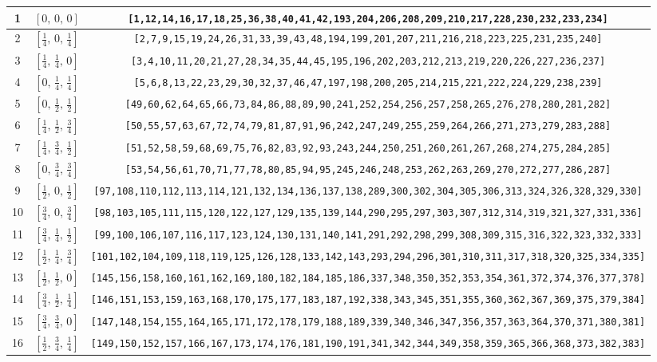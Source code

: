 \documentclass[fleqn,8pt]{jsarticle}
\begin{document}
\begin{longtable}{ccc}
1 & $\left[ 0,\, 0,\, 0 \right]$ & {\tt [1,12,14,16,17,18,25,36,38,40,41,42,193,204,206,208,209,210,217,228,230,232,233,234]} \\ \hline
2 & $\left[ \frac{1}{4},\, 0,\, \frac{1}{4} \right]$ & {\tt [2,7,9,15,19,24,26,31,33,39,43,48,194,199,201,207,211,216,218,223,225,231,235,240]} \\ \hline
3 & $\left[ \frac{1}{4},\, \frac{1}{4},\, 0 \right]$ & {\tt [3,4,10,11,20,21,27,28,34,35,44,45,195,196,202,203,212,213,219,220,226,227,236,237]} \\ \hline
4 & $\left[ 0,\, \frac{1}{4},\, \frac{1}{4} \right]$ & {\tt [5,6,8,13,22,23,29,30,32,37,46,47,197,198,200,205,214,215,221,222,224,229,238,239]} \\ \hline
5 & $\left[ 0,\, \frac{1}{2},\, \frac{1}{2} \right]$ & {\tt [49,60,62,64,65,66,73,84,86,88,89,90,241,252,254,256,257,258,265,276,278,280,281,282]} \\ \hline
6 & $\left[ \frac{1}{4},\, \frac{1}{2},\, \frac{3}{4} \right]$ & {\tt [50,55,57,63,67,72,74,79,81,87,91,96,242,247,249,255,259,264,266,271,273,279,283,288]} \\ \hline
7 & $\left[ \frac{1}{4},\, \frac{3}{4},\, \frac{1}{2} \right]$ & {\tt [51,52,58,59,68,69,75,76,82,83,92,93,243,244,250,251,260,261,267,268,274,275,284,285]} \\ \hline
8 & $\left[ 0,\, \frac{3}{4},\, \frac{3}{4} \right]$ & {\tt [53,54,56,61,70,71,77,78,80,85,94,95,245,246,248,253,262,263,269,270,272,277,286,287]} \\ \hline
9 & $\left[ \frac{1}{2},\, 0,\, \frac{1}{2} \right]$ & {\tt [97,108,110,112,113,114,121,132,134,136,137,138,289,300,302,304,305,306,313,324,326,328,329,330]} \\ \hline
10 & $\left[ \frac{3}{4},\, 0,\, \frac{3}{4} \right]$ & {\tt [98,103,105,111,115,120,122,127,129,135,139,144,290,295,297,303,307,312,314,319,321,327,331,336]} \\ \hline
11 & $\left[ \frac{3}{4},\, \frac{1}{4},\, \frac{1}{2} \right]$ & {\tt [99,100,106,107,116,117,123,124,130,131,140,141,291,292,298,299,308,309,315,316,322,323,332,333]} \\ \hline
12 & $\left[ \frac{1}{2},\, \frac{1}{4},\, \frac{3}{4} \right]$ & {\tt [101,102,104,109,118,119,125,126,128,133,142,143,293,294,296,301,310,311,317,318,320,325,334,335]} \\ \hline
13 & $\left[ \frac{1}{2},\, \frac{1}{2},\, 0 \right]$ & {\tt [145,156,158,160,161,162,169,180,182,184,185,186,337,348,350,352,353,354,361,372,374,376,377,378]} \\ \hline
14 & $\left[ \frac{3}{4},\, \frac{1}{2},\, \frac{1}{4} \right]$ & {\tt [146,151,153,159,163,168,170,175,177,183,187,192,338,343,345,351,355,360,362,367,369,375,379,384]} \\ \hline
15 & $\left[ \frac{3}{4},\, \frac{3}{4},\, 0 \right]$ & {\tt [147,148,154,155,164,165,171,172,178,179,188,189,339,340,346,347,356,357,363,364,370,371,380,381]} \\ \hline
16 & $\left[ \frac{1}{2},\, \frac{3}{4},\, \frac{1}{4} \right]$ & {\tt [149,150,152,157,166,167,173,174,176,181,190,191,341,342,344,349,358,359,365,366,368,373,382,383]} \\
\end{longtable}
\end{document}
